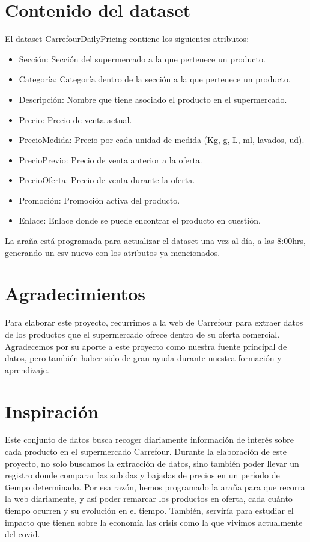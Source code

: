 \documentclass{article}
\begin{document}
\pagebreak
\section{Contenido del dataset}
El dataset CarrefourDailyPricing contiene los siguientes atributos:

\begin{itemize}
    \item {Sección}: Sección del supermercado a la que pertenece un producto.
    \item {Categoría}: Categoría dentro de la sección a la que pertenece un producto.
    \item {Descripción}: Nombre que tiene asociado el producto en el supermercado.
    \item {Precio}: Precio de venta actual.
    \item {PrecioMedida}: Precio por cada unidad de medida (Kg, g, L, ml, lavados, ud).
    \item {PrecioPrevio}: Precio de venta anterior a la oferta.
    \item {PrecioOferta}: Precio de venta durante la oferta.
    \item {Promoción}: Promoción activa del producto.
    \item {Enlace}: Enlace donde se puede encontrar el producto en cuestión.
\end{itemize}

La araña está programada para actualizar el dataset una vez al día, a las 8:00hrs, generando un csv nuevo con los atributos ya mencionados.

\section{Agradecimientos}
Para  elaborar  este proyecto, recurrimos a  la  web  de Carrefour  para  extraer datos  de  los productos que el supermercado ofrece dentro de su oferta comercial. Agradecemos por su aporte a este proyecto como  nuestra  fuente  principal de datos, pero también haber sido de gran ayuda durante nuestra formación y aprendizaje.

\section{Inspiración}
Este conjunto de datos busca recoger diariamente información de interés sobre cada producto en  el  supermercado Carrefour.  Durante la  elaboración  de  este  proyecto,  no  solo  buscamos  la extracción de datos, sino también poder llevar un registro donde comparar las subidas y bajadas de precios en un período de tiempo determinado. Por esa razón, hemos programado la araña para que recorra la web diariamente, y así poder remarcar los productos en oferta, cada cuánto tiempo ocurren y su evolución en el tiempo. También, serviría para estudiar el impacto que tienen sobre la economía las crisis como la que vivimos actualmente del covid.
\end{document}
